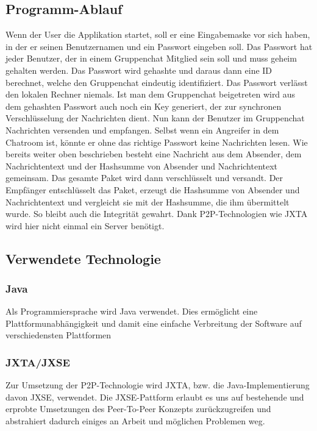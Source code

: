 \documentclass[12pt,a4paper,titlepage,oneside]{scrartcl}
\begin{document}
\newpage
\subsection{Programm-Ablauf}
Wenn der User die Applikation startet, soll er eine Eingabemaske vor sich haben, in der er seinen Benutzernamen und ein Passwort eingeben soll. Das Passwort hat jeder Benutzer, der in einem Gruppenchat Mitglied sein soll und muss geheim gehalten werden. Das Passwort wird gehashte und daraus dann eine ID berechnet, welche den Gruppenchat eindeutig identifiziert. Das Passwort verl\"{a}sst den lokalen Rechner niemals. Ist man dem Gruppenchat beigetreten wird aus dem gehashten Passwort auch noch ein Key generiert, der zur synchronen Verschl\"{u}sselung der Nachrichten dient. Nun kann der Benutzer im Gruppenchat Nachrichten versenden und empfangen. Selbst wenn ein Angreifer in dem Chatroom ist, k\"{o}nnte er ohne das richtige Passwort keine Nachrichten lesen.
Wie bereits weiter oben beschrieben besteht eine Nachricht aus dem Absender, dem Nachrichtentext und der Hashsumme von Absender und Nachrichtentext gemeinsam. Das gesamte Paket wird dann verschl\"{u}sselt und versandt. Der Empf\"{a}nger entschl\"{u}sselt das Paket, erzeugt die Hashsumme von Absender und Nachrichtentext und vergleicht sie mit der Hashsumme, die ihm \"{u}bermittelt wurde. So bleibt auch die Integrit\"{a}t gewahrt.
Dank P2P-Technologien wie JXTA wird hier nicht einmal ein Server ben\"{o}tigt.

\subsection{Verwendete Technologie}

\subsubsection{Java}
Als Programmiersprache wird Java verwendet. Dies erm\"{o}glicht eine Plattformunabh\"{a}ngigkeit und damit eine einfache Verbreitung der Software auf verschiedensten Plattformen

\subsubsection{JXTA/JXSE}
Zur Umsetzung der P2P-Technologie wird JXTA, bzw. die Java-Implementierung davon JXSE, verwendet. Die JXSE-Pattform erlaubt es uns auf bestehende und erprobte Umsetzungen des Peer-To-Peer Konzepts zur\"{u}ckzugreifen und abstrahiert dadurch einiges an Arbeit und m\"{o}glichen Problemen weg.
\end{document}
